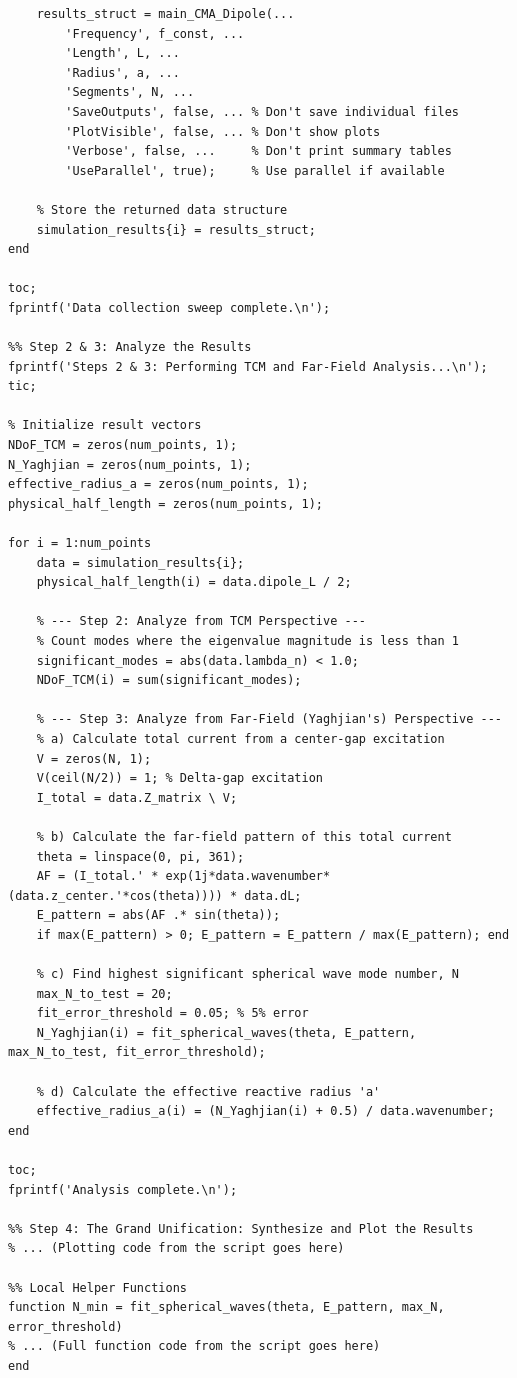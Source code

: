 \documentclass[11pt, a4paper]{report}
\begin{document}
\begin{lstlisting}[caption={Driver script for Phase 3 Unification Analysis.}, label={lst:run_phase3}]
    % Call the CMA solver in "silent" mode to only get the data back
    results_struct = main_CMA_Dipole(...
        'Frequency', f_const, ...
        'Length', L, ...
        'Radius', a, ...
        'Segments', N, ...
        'SaveOutputs', false, ... % Don't save individual files
        'PlotVisible', false, ... % Don't show plots
        'Verbose', false, ...     % Don't print summary tables
        'UseParallel', true);     % Use parallel if available
    
    % Store the returned data structure
    simulation_results{i} = results_struct;
end

toc;
fprintf('Data collection sweep complete.\n');

%% Step 2 & 3: Analyze the Results
fprintf('Steps 2 & 3: Performing TCM and Far-Field Analysis...\n');
tic;

% Initialize result vectors
NDoF_TCM = zeros(num_points, 1);
N_Yaghjian = zeros(num_points, 1);
effective_radius_a = zeros(num_points, 1);
physical_half_length = zeros(num_points, 1);

for i = 1:num_points
    data = simulation_results{i};
    physical_half_length(i) = data.dipole_L / 2;

    % --- Step 2: Analyze from TCM Perspective ---
    % Count modes where the eigenvalue magnitude is less than 1
    significant_modes = abs(data.lambda_n) < 1.0;
    NDoF_TCM(i) = sum(significant_modes);

    % --- Step 3: Analyze from Far-Field (Yaghjian's) Perspective ---
    % a) Calculate total current from a center-gap excitation
    V = zeros(N, 1);
    V(ceil(N/2)) = 1; % Delta-gap excitation
    I_total = data.Z_matrix \ V;
    
    % b) Calculate the far-field pattern of this total current
    theta = linspace(0, pi, 361);
    AF = (I_total.' * exp(1j*data.wavenumber*(data.z_center.'*cos(theta)))) * data.dL;
    E_pattern = abs(AF .* sin(theta));
    if max(E_pattern) > 0; E_pattern = E_pattern / max(E_pattern); end
    
    % c) Find highest significant spherical wave mode number, N
    max_N_to_test = 20;
    fit_error_threshold = 0.05; % 5% error
    N_Yaghjian(i) = fit_spherical_waves(theta, E_pattern, max_N_to_test, fit_error_threshold);

    % d) Calculate the effective reactive radius 'a'
    effective_radius_a(i) = (N_Yaghjian(i) + 0.5) / data.wavenumber;
end

toc;
fprintf('Analysis complete.\n');

%% Step 4: The Grand Unification: Synthesize and Plot the Results
% ... (Plotting code from the script goes here)

%% Local Helper Functions
function N_min = fit_spherical_waves(theta, E_pattern, max_N, error_threshold)
% ... (Full function code from the script goes here)
end
\end{lstlisting}
\end{document}
